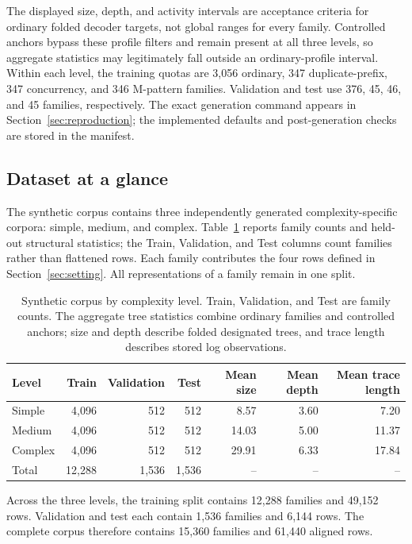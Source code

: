 \documentclass[pdflatex,sn-basic]{sn-jnl}
\begin{document}
The displayed size, depth, and activity intervals are acceptance criteria for ordinary folded decoder targets, not global ranges for every family. Controlled anchors bypass these profile filters and remain present at all three levels, so aggregate statistics may legitimately fall outside an ordinary-profile interval. Within each level, the training quotas are 3,056 ordinary, 347 duplicate-prefix, 347 concurrency, and 346 M-pattern families. Validation and test use 376, 45, 46, and 45 families, respectively. The exact generation command appears in Section~\ref{sec:reproduction}; the implemented defaults and post-generation checks are stored in the manifest.

\subsection{Dataset at a glance}

The synthetic corpus contains three independently generated complexity-specific corpora: simple, medium, and complex. Table~\ref{tab:corpus} reports family counts and held-out structural statistics; the Train, Validation, and Test columns count families rather than flattened rows. Each family contributes the four rows defined in Section~\ref{sec:setting}. All representations of a family remain in one split.

\begin{table}[!t]
\centering
\caption{Synthetic corpus by complexity level. Train, Validation, and Test are family counts. The aggregate tree statistics combine ordinary families and controlled anchors; size and depth describe folded designated trees, and trace length describes stored log observations.}
\label{tab:corpus}
\setlength{\tabcolsep}{3.4pt}
\begin{tabular}{@{}lrrrrrr@{}}
\toprule
Level & Train & Validation & Test & Mean size & Mean depth & Mean trace length \\
\midrule
Simple  & 4,096 & 512 & 512 & 8.57 & 3.60 & 7.20 \\
Medium  & 4,096 & 512 & 512 & 14.03 & 5.00 & 11.37 \\
Complex & 4,096 & 512 & 512 & 29.91 & 6.33 & 17.84 \\
\midrule
Total & 12,288 & 1,536 & 1,536 & -- & -- & -- \\
\bottomrule
\end{tabular}
\end{table}

Across the three levels, the training split contains 12,288 families and 49,152 rows. Validation and test each contain 1,536 families and 6,144 rows. The complete corpus therefore contains 15,360 families and 61,440 aligned rows.
\end{document}
